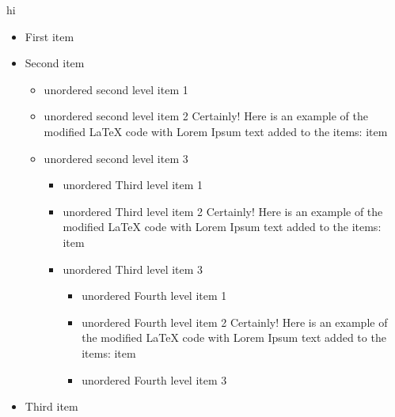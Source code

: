hi
\begin{itemize}
    \item First item
    \item Second item
    \begin{itemize}
        \item unordered second level item 1
        \item unordered second level item 2 Certainly! Here is an example of the modified LaTeX code with Lorem Ipsum text
        added to the items: item
        \item unordered second level item 3
        \begin{itemize}
            \item unordered Third level item 1
            \item unordered Third level item 2 Certainly! Here is an example of the modified LaTeX code with Lorem Ipsum text
            added to the items: item
            \item unordered Third level item 3
            \begin{itemize}
                \item unordered Fourth level item 1
                \item unordered Fourth level item 2 Certainly! Here is an example of the modified LaTeX code with Lorem Ipsum text
                added to the items: item
                \item unordered Fourth level item 3
            \end{itemize}
        \end{itemize}
    \end{itemize}
    \item Third item
\end{itemize}
\fi